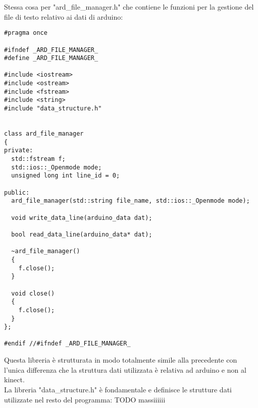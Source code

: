 \documentclass[10pt,a4paper]{article}
\begin{document}
%
%
Stessa cosa per "ard\_file\_manager.h" che contiene le funzioni per la gestione del file di testo relativo ai dati di arduino:
\begin{lstlisting}[style=mycpp, caption=librerie usate, captionpos=b]
#pragma once

#ifndef _ARD_FILE_MANAGER_
#define _ARD_FILE_MANAGER_

#include <iostream>
#include <ostream>
#include <fstream>
#include <string>
#include "data_structure.h"


class ard_file_manager
{
private:
  std::fstream f;
  std::ios::_Openmode mode;
  unsigned long int line_id = 0;

public:
  ard_file_manager(std::string file_name, std::ios::_Openmode mode);

  void write_data_line(arduino_data dat);

  bool read_data_line(arduino_data* dat);

  ~ard_file_manager()
  {
    f.close();
  }

  void close()
  {
    f.close();
  }
};

#endif //#ifndef _ARD_FILE_MANAGER_
\end{lstlisting}
Questa libreria \`e strutturata in modo totalmente simile alla precedente con l'unica differenza che la struttura dati utilizzata \`e relativa ad arduino e non al kinect.
\\
%
%
La libreria "data\_structure.h" \`e fondamentale e definisce le strutture dati utilizzate nel resto del programma:
TODO massiiiiii
\end{document}

